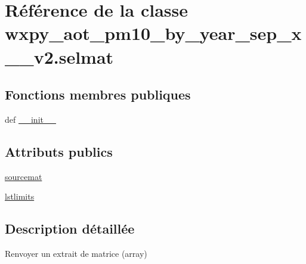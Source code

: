 \hypertarget{classwxpy__aot__pm10__by__year__sep__x__2009__v2_1_1selmat}{\section{Référence de la classe wxpy\-\_\-aot\-\_\-pm10\-\_\-by\-\_\-year\-\_\-sep\-\_\-x\-\_\-\_\-v2.\-selmat}
\label{classwxpy__aot__pm10__by__year__sep__x__2009__v2_1_1selmat}
}
\subsection*{Fonctions membres publiques}
\begin{DoxyCompactItemize}
\item 
def \hyperlink{classwxpy__aot__pm10__by__year__sep__x__2009__v2_1_1selmat_a66bcb5ab38d0a1c471208b65f22b9cb5}{\-\_\-\-\_\-init\-\_\-\-\_\-}
\end{DoxyCompactItemize}
\subsection*{Attributs publics}
\begin{DoxyCompactItemize}
\item 
\hyperlink{classwxpy__aot__pm10__by__year__sep__x__2009__v2_1_1selmat_a15e02ca0f998d05c6eb07057f7547265}{sourcemat}
\item 
\hyperlink{classwxpy__aot__pm10__by__year__sep__x__2009__v2_1_1selmat_a7fec5adb0cd9a35b68ba77e044603c29}{lstlimits}
\end{DoxyCompactItemize}


\subsection{Description détaillée}
\begin{DoxyVerb}Renvoyer un extrait de matrice (array) \end{DoxyVerb}
 

